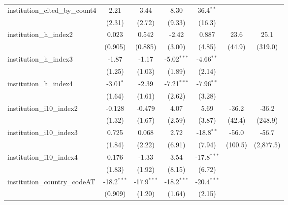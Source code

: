 \begin{tabular}{lcccccc}
   institution\_cited\_by\_count4        & 2.21          & 3.44          & 8.30          & 36.4$^{**}$   &              &   \\   
                                         & (2.31)        & (2.72)        & (9.33)        & (16.3)        &              &   \\   
   institution\_h\_index2                & 0.023         & 0.542         & -2.42         & 0.887         & 23.6         & 25.1\\   
                                         & (0.905)       & (0.885)       & (3.00)        & (4.85)        & (44.9)       & (319.0)\\   
   institution\_h\_index3                & -1.87         & -1.17         & -5.02$^{***}$ & -4.66$^{**}$  &              &   \\   
                                         & (1.25)        & (1.03)        & (1.89)        & (2.14)        &              &   \\   
   institution\_h\_index4                & -3.01$^{*}$   & -2.39         & -7.21$^{***}$ & -7.96$^{**}$  &              &   \\   
                                         & (1.64)        & (1.61)        & (2.62)        & (3.28)        &              &   \\   
   institution\_i10\_index2              & -0.128        & -0.479        & 4.07          & 5.69          & -36.2        & -36.2\\   
                                         & (1.32)        & (1.67)        & (2.59)        & (3.87)        & (42.4)       & (248.9)\\   
   institution\_i10\_index3              & 0.725         & 0.068         & 2.72          & -18.8$^{**}$  & -56.0        & -56.7\\   
                                         & (1.84)        & (2.22)        & (6.91)        & (7.94)        & (100.5)      & (2,877.5)\\   
   institution\_i10\_index4              & 0.176         & -1.33         & 3.54          & -17.8$^{***}$ &              &   \\   
                                         & (1.83)        & (1.92)        & (8.15)        & (6.72)        &              &   \\   
   institution\_country\_codeAT          & -18.2$^{***}$ & -17.9$^{***}$ & -18.2$^{***}$ & -20.4$^{***}$ &              &   \\   
                                         & (0.909)       & (1.20)        & (1.64)        & (2.15)        &              &   \\   

\end{tabular}

